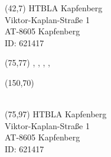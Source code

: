 \documentclass [8pt]{article}
\begin{document}
\pagestyle{empty}

{
\begin{textblock}{55}(42,7)
HTBLA Kapfenberg\\
Viktor-Kaplan-Straße 1\\
AT-8605 Kapfenberg\\
ID: 621417
\end{textblock}


\begin{textblock}{60}(75,77)
\NachrichtTyp, \Lehrer, \Klasse, \Schuler, \Jahr
\end{textblock}

\begin{textblock}{45}(150,70)
\AddrB\\
\AddrC\\
\AddrD
\end{textblock}


\begin{textblock}{55}(75,97)
HTBLA Kapfenberg\\
Viktor-Kaplan-Straße 1\\
AT-8605 Kapfenberg\\
ID: 621417
\end{textblock}


\newpage
}
\end{document}

